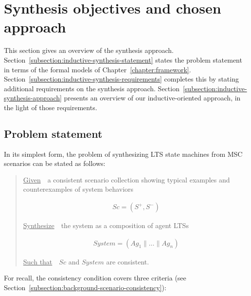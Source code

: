 \section{Synthesis objectives and chosen approach\label{section:inductive-overview}}

This section gives an overview of the synthesis approach. Section~\ref{subsection:inductive-synthesis-statement} states the problem statement in terms of the formal models of Chapter~\ref{chapter:framework}. Section~\ref{subsection:inductive-synthesis-requirements} completes this by stating additional requirements on the synthesis approach. Section~\ref{subsection:inductive-synthesis-approach} presents an overview of our inductive-oriented approach, in the light of those requirements.


\subsection{Problem statement\label{subsection:inductive-synthesis-statement}}

In its simplest form, the problem of synthesizing LTS state machines from MSC scenarios can be stated as follows:

\begin{quotation}
\noindent \underline{Given}~~a consistent scenario collection showing typical examples and counterexamples of system behaviors

\vspace{-0.7cm}
\begin{align*}
Sc = (S^+,S^-)
\end{align*}

\vspace{-0.2cm}
\noindent \underline{Synthesize}~~the system as a composition of agent LTSs

\vspace{-0.7cm}
\begin{align*}
System = (Ag_1 \parallel \ldots \parallel Ag_n)
\end{align*}

\vspace{-0.2cm}
\noindent \underline{Such that}~~$Sc$ and $System$ are consistent.
\end{quotation}

\noindent For recall, the consistency condition covers three criteria (see Section~\ref{subsection:background-scenario-consistency}):

